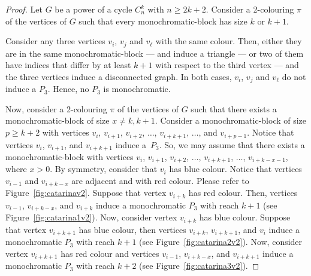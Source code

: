 \documentclass{article}
\begin{document}
\begin{proof}
Let $G$ be a power of a cycle $C_{n}^{k}$ with $n \geq 2k + 2$.
Consider a 2-colouring $\pi$ of the vertices of $G$ such that every
monochromatic-block has size $k$ or $k+1$. 

Consider any three vertices $v_i$, $v_j$ and $v_\ell$ with the
same colour. Then, either they are in the same monochromatic-block --- and
induce a triangle --- or two of them have indices that differ by at least $k+1$
with respect to the third vertex --- and the three vertices induce a
disconnected graph. In both cases, $v_i$, $v_j$ and $v_\ell$ do not induce a
$P_3$. Hence, no $P_3$ is monochromatic.

Now, consider a 2-colouring $\pi$ of the vertices of $G$ such that there exists
a monochromatic-block of size $x \neq k, k+1$.
Consider a monochromatic-block of size $p \geq k+2$ with vertices
$v_{i}$, $v_{i+1}$, $v_{i+2}$, $\ldots$, $v_{i+k+1}$, $\ldots$, and
$v_{i+p-1}$.
Notice that vertices $v_{i}$, $v_{i+1}$, and $v_{i+k+1}$ induce a~$P_3$. So, we
may assume that there exists a monochromatic-block with vertices
$v_{i}$, $v_{i+1}$, $v_{i+2}$, $\ldots$, $v_{i+k+1}$, $\ldots$, $v_{i+k-x-1}$,
where $x > 0$. By symmetry, consider that $v_i$ has blue colour. Notice that
vertices $v_{i-1}$ and $v_{i+k-x}$ are adjacent and with red colour. Please
refer to Figure~\ref{fig:catarinav2}. Suppose that vertex $v_{i+k}$ has
red colour. Then, vertices $v_{i-1}$, $v_{i+k-x}$, and $v_{i+k}$ induce a monochromatic
$P_3$ with reach $k+1$ (see Figure~\ref{fig:catarina1v2}).
Now, consider vertex $v_{i+k}$ has blue colour. Suppose that vertex $v_{i+k+1}$
has blue colour, then vertices $v_{i+k}$, $v_{i+k+1}$, and $v_{i}$ induce a 
monochromatic $P_3$ with reach $k+1$ (see Figure~\ref{fig:catarina2v2}). Now,
consider vertex $v_{i+k+1}$ has red colour and vertices $v_{i-1}$,
$v_{i+k-x}$, and $v_{i+k+1}$ induce a monochromatic $P_3$ with reach $k+2$ (see
Figure~\ref{fig:catarina3v2}).


\end{proof}
\end{document}
